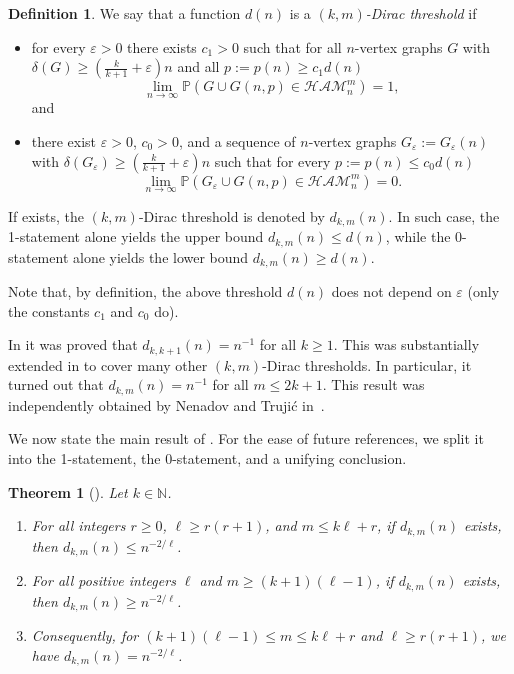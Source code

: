 \documentclass[reqno, 12pt]{amsart}
\numberwithin{equation}{section}
\numberwithin{figure}{section}
\let\epsilon=\varepsilon
\let\eps=\epsilon
\def\PP{{\mathds P}}
\let\Prob=\PP
\newcommand{\ham}{\mathcal{HAM}}
\theoremstyle{plain}
\newtheorem{theorem}[thm]{Theorem}
\theoremstyle{definition}
\newtheorem{dfn}[thm]{Definition}
\begin{document}
\begin{dfn}\label{thres}
We say that a function $d(n)$ is a \emph{$(k,m)$-Dirac threshold} if
    \begin{itemize}
	\item[(i)] for every $\eps>0$ there exists     $c_1>0$ such that for all $n$-vertex graphs $G$ with $\delta(G)\ge\left(\tfrac k{k+1}+\eps\right)n$ and all $p:=p(n)\ge c_1d(n)$
    $$\lim_{n\to\infty}\Prob\left(G\cup G(n,p)\in\ham^m_n\right)=1,$$
	and
	\item[(ii)]  there exist $\epsilon>0$, $c_0>0$, and a sequence of $n$-vertex graphs $G_\epsilon:=G_\epsilon(n)$ with $\delta(G_\eps)\ge\left(\tfrac k{k+1}+\epsilon\right)n$ such that for every $p:=p(n)\le c_0d(n)$
    $$\lim_{n\to\infty}\Prob\left(G_\eps\cup G(n,p)\in\ham^m_n\right)=0.$$
    \end{itemize}

If exists, the $(k,m)$-Dirac threshold is denoted by $d_{k,m}(n)$. In such case, the 1-statement alone yields the upper bound $d_{k,m}(n)\le d(n)$, while the 0-statement alone yields the lower bound $d_{k,m}(n)\ge d(n)$.
\end{dfn}

Note that, by definition, the above threshold $d(n)$ does not depend on $\eps$ (only the constants $c_1$ and $c_0$ do).
	
In \cite{DRRS} it was proved that $d_{k,k+1}(n)=n^{-1}$ for all $k\ge1$. This was substantially extended in \cite{ADRRS} to cover many other $(k,m)$-Dirac thresholds. In particular, it turned out that $d_{k,m}(n)=n^{-1}$ for all $m\le 2k+1$. This result was independently obtained by Nenadov and Truji\'{c} in~\cite{NT}.

We now state the main result of \cite{ADRRS}. For the ease of future references, we split it into the 1-statement, the 0-statement, and a unifying conclusion.

\begin{theorem}[\cite{ADRRS}]\label{21}
Let $k\in\mathbb{N}$.
\begin{enumerate}
    \item[(a)] For all integers $r\geq 0$, $\ell\geq r(r+1)$, and $m\le k\ell+r$, if $d_{k, m}(n)$ exists, then $d_{k, m}(n)\leq n^{-2/\ell}$.
    \item[(b)] For all positive integers $\ell$ and $m\ge (k+1)(\ell-1)$, if $d_{k, m}(n)$ exists, then $d_{k,m}(n)\geq n^{-2/\ell}$.
    \item[(c)] Consequently, for $(k+1)(\ell-1)\le m\le k\ell+r$ and $\ell\geq r(r+1)$, we have $d_{k,m}(n)= n^{-2/\ell}$.
  \end{enumerate}
\end{theorem}
\end{document}

